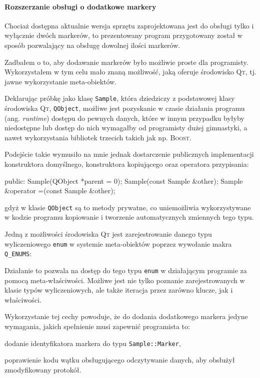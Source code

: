 \paragraph{Rozszerzanie obsługi o dodatkowe markery}
Chociaż dostępna aktualnie wersja sprzętu zaprojektowana jest do obsługi tylko i wyłącznie dwóch markerów, to prezentowany program przygotowany został w sposób pozwalający na obsługę dowolnej ilości markerów.

Zadbałem o to, aby dodawanie markerów było możliwie proste dla programisty. Wykorzystałem w tym celu mało znaną możliwość, jaką oferuje środowisko \textsc{Qt}, tj. jawne wykorzystanie meta-obiektów.

Deklarując próbkę jako klasę \verb|Sample|, która dziedziczy z podstawowej klasy środowiska \textsc{Qt}, \verb|QObject|, możliwe jest pozyskanie w czasie działania programu (ang. \textsl{runtime}) dostępu do pewnych danych, które w innym przypadku byłyby niedostępne lub dostęp do nich wymagałby od programisty dużej gimnastyki, a nawet wykorzystania bibliotek trzecich takich jak np. \textsc{Boost}.

Podejście takie wymusiło na mnie jednak dostarczenie publicznych implementacji konstruktora domyślnego, konstruktora kopiującego oraz operatora przypisania:
\begin{verbatimtab}
public:
	Sample(QObject *parent = 0);
	Sample(const Sample &other);
	Sample &operator =(const Sample &other);
\end{verbatimtab}
gdyż w klasie \verb|QObject| są to metody prywatne, co uniemożliwia wykorzystywane w kodzie programu kopiowanie i tworzenie automatycznych zmiennych tego typu.

Jedną z możliwości środowiska \textsc{Qt} jest zarejestrowanie danego typu wyliczeniowego \verb|enum| w systemie meta-obiektów poprzez wywołanie makra \verb|Q_ENUMS|:
\begin{verbatimtab}
class Sample : public QObject
{
	Q_OBJECT;
	Q_ENUMS(Marker);
public:
	enum Marker {Blue = 1, Yellow = 2};
	(...)
\end{verbatimtab}

Działanie to pozwala na dostęp do tego typu \verb|enum| w działającym programie za pomocą meta-właściwości. Możliwe jest nie tylko poznanie zarejestrowanych w klasie typów wyliczeniowych, ale także iteracja przez zarówno klucze, jak i właściwości.

Wykorzystanie tej cechy powoduje, że do dodania dodatkowego markera jedyne wymagania, jakich spełnienie musi zapewnić programista to:
\begin{aenumerate}
  \item dodanie identyfikatora markera do typu \verb|Sample::Marker|,
  \item poprawienie kodu wątku obsługującego odczytywanie danych, aby obsłużył zmodyfikowany protokół.\label{item:modify_protocol}
\end{aenumerate}


